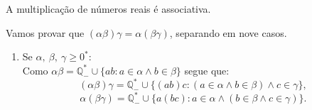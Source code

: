 \documentclass[../main.tex]{subfiles}
\begin{document}
\begin{prop}\label{reais-prop-produtoAssociativo}
    A multiplicação de números reais é associativa.
\end{prop}
\begin{dem}
    Vamos provar que $(\alpha\beta)\gamma = \alpha(\beta\gamma)$, separando em nove casos. 
    \begin{enumerate}
        \item Se $\alpha,\ \beta,\ \gamma \geq 0^*$: \\
            Como $\alpha\beta = \mathbb{Q}_{-}^* \cup \{ ab : a \in \alpha \land b \in \beta \}$ segue que: 
            \[ (\alpha\beta)\gamma = \mathbb{Q}_{-}^* \cup \{ (ab)c : (a \in \alpha \land b \in \beta) \land c \in \gamma \}, \]
            \[ \alpha(\beta\gamma) = \mathbb{Q}_{-}^* \cup \{ a(bc) : a \in \alpha \land (b \in \beta \land c \in \gamma) \}. \]
    

\end{enumerate}
\end{dem}
\end{document}
